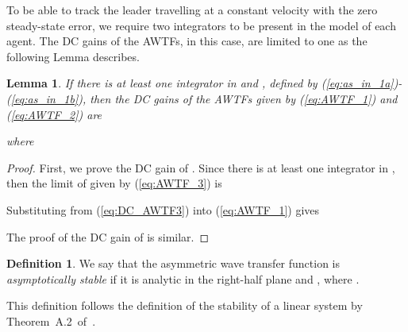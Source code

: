\documentclass[10pt,twocolumn,twoside]{IEEEtran}
\newtheorem{lemma}{Lemma}
\theoremstyle{definition}
\newtheorem{defn}{Definition}
\begin{document}
To be able to track the leader travelling at a constant velocity with the zero steady-state error, we require two integrators to be present in the model of each agent. The DC gains of the AWTFs, in this case, are limited to one as the following Lemma describes.
\begin{lemma}\label{lemma:DC_gains}
  If there is at least one integrator in  and , defined by (\ref{eq:as_in_1a})-(\ref{eq:as_in_1b}), then the DC gains of the AWTFs given by (\ref{eq:AWTF_1}) and (\ref{eq:AWTF_2}) are
  
  where
  
\end{lemma}
\begin{proof}
  First, we prove the DC gain of . Since there is at least one integrator in , then the limit of  given by (\ref{eq:AWTF_3}) is
  
  Substituting from (\ref{eq:DC_AWTF3}) into (\ref{eq:AWTF_1}) gives
  
  The proof of the DC gain of  is similar.
\end{proof}




\begin{defn}
  We say that the asymmetric wave transfer function  is \emph{asymptotically stable} if it is analytic in the right-half plane and , where .
\end{defn}
This definition follows the definition of the stability of a linear system by Theorem~A.2~of~\cite{Curtain2009}.
\end{document}
